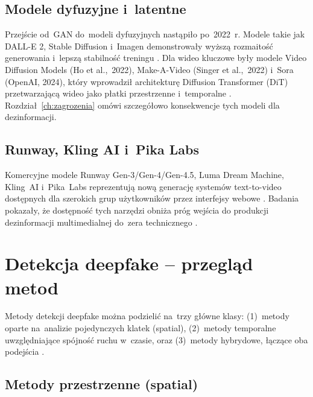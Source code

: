 \subsection{Modele dyfuzyjne i~latentne}

Przej\'{s}cie od~GAN do~modeli dyfuzyjnych nast\k{a}pi\l{}o po~2022~r.
Modele takie jak DALL-E 2, Stable Diffusion i~Imagen demonstrowa\l{}y
wy\.{z}sz\k{a} rozmaito\'{s}\'{c} generowania i~lepsz\k{a} stabilno\'{s}\'{c} treningu
\cite{Ho2020DDPM}.
Dla wideo kluczowe by\l{}y modele Video Diffusion Models (Ho et al.,~2022),
Make-A-Video (Singer et al.,~2022) i~Sora (OpenAI, 2024), kt\'{o}ry
wprowadzi\l{} architektur\k{e} Diffusion Transformer (DiT) przetwarzaj\k{a}c\k{a}
wideo jako p\l{}atki przestrzenne i~temporalne
\cite{Videoworldsimulators2024}.
Rozdzia\l{}~\ref{ch:zagrozenia} om\'{o}wi szczeg\'{o}\l{}owo konsekwencje
tych modeli dla dezinformacji.

\subsection{Runway, Kling AI i~Pika Labs}

Komercyjne modele Runway Gen-3/Gen-4/Gen-4.5, Luma Dream Machine, Kling~AI
i~Pika~Labs reprezentuj\k{a} now\k{a} generacj\k{e} system\'{o}w text-to-video
dost\k{e}pnych dla szerokich grup u\.{z}ytkownik\'{o}w przez interfejsy webowe
\cite{Runway2024Gen3}.
Badania pokaza\l{}y, \.{z}e dost\k{e}pno\'{s}\'{c} tych narz\k{e}dzi obni\.{z}a pr\'{o}g
wej\'{s}cia do produkcji dezinformacji multimedialnej do~zera technicznego
\cite{Li2025AIGCSurvey}.

\section{Detekcja deepfake -- przegl\k{a}d metod}
\label{sec:detekcja_przeglad}

Metody detekcji deepfake mo\.{z}na podzieli\'{c} na~trzy g\l{}\'{o}wne klasy:
(1)~metody oparte na~analizie pojedynczych klatek (spatial),
(2)~metody temporalne uwzgl\k{e}dniaj\k{a}ce sp\'{o}jno\'{s}\'{c} ruchu w~czasie,
oraz (3)~metody hybrydowe, \l{}\k{a}cz\k{a}ce oba podej\'{s}cia
\cite{Wang2024ReliabilityPerspective}.

\subsection{Metody przestrzenne (spatial)}

